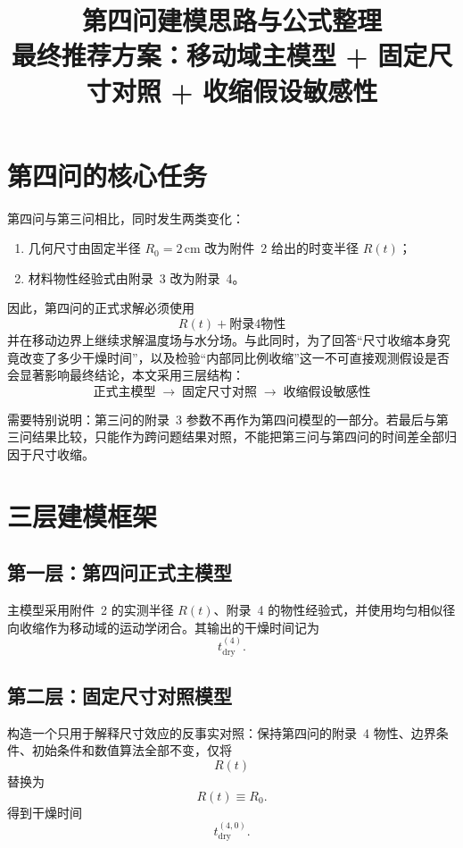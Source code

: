 \documentclass[UTF8,a4paper,12pt]{ctexart}
\title{第四问建模思路与公式整理\\\large 最终推荐方案：移动域主模型 + 固定尺寸对照 + 收缩假设敏感性}
\author{}
\date{}
\begin{document}
\maketitle

\section{第四问的核心任务}

第四问与第三问相比，同时发生两类变化：
\begin{enumerate}[label=(\arabic*)]
    \item 几何尺寸由固定半径 $R_0=2\,\mathrm{cm}$ 改为附件~2 给出的时变半径 $R(t)$；
    \item 材料物性经验式由附录~3 改为附录~4。
\end{enumerate}

因此，第四问的正式求解必须使用
\[
\boxed{R(t)+\text{附录4物性}}
\]
并在移动边界上继续求解温度场与水分场。与此同时，为了回答“尺寸收缩本身究竟改变了多少干燥时间”，以及检验“内部同比例收缩”这一不可直接观测假设是否会显著影响最终结论，本文采用三层结构：
\[
\boxed{
\text{正式主模型}
\;\longrightarrow\;
\text{固定尺寸对照}
\;\longrightarrow\;
\text{收缩假设敏感性}
}
\]

需要特别说明：第三问的附录~3 参数不再作为第四问模型的一部分。若最后与第三问结果比较，只能作为跨问题结果对照，不能把第三问与第四问的时间差全部归因于尺寸收缩。

\section{三层建模框架}

\subsection{第一层：第四问正式主模型}

主模型采用附件~2 的实测半径 $R(t)$、附录~4 的物性经验式，并使用均匀相似径向收缩作为移动域的运动学闭合。其输出的干燥时间记为
\[
\boxed{t_{\mathrm{dry}}^{(4)}}.
\]

\subsection{第二层：固定尺寸对照模型}

构造一个只用于解释尺寸效应的反事实对照：保持第四问的附录~4 物性、边界条件、初始条件和数值算法全部不变，仅将
\[
R(t)
\]
替换为
\[
R(t)\equiv R_0.
\]
得到干燥时间
\[
\boxed{t_{\mathrm{dry}}^{(4,0)}}.
\]
\end{document}
